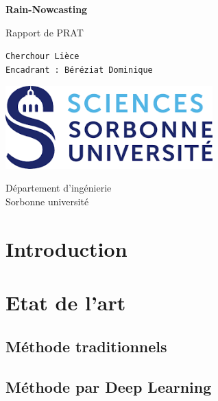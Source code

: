 \documentclass[a4paper]{article}
\begin{document}
\begin{titlepage}
    \begin{center}
            
        \Huge
        \textbf{Rain-Nowcasting}
        
            
        \vspace{0.5cm}
        \LARGE
        Rapport de PRAT
            
        \vspace{1.5cm}
            
        \texttt{Cherchour Lièce} \\ 
        \texttt{Encadrant : Béréziat Dominique}
            
        \vfill
        \vspace{0.8cm}
            
        \includegraphics[width=0.6\textwidth]{assets/sc_uni.png}
            
        \Large
        Département d'ingénierie\\
        Sorbonne université
    \end{center}
\end{titlepage}
\tableofcontents
\newpage
\section{Introduction}
\section{Etat de l'art}
\subsection{Méthode traditionnels}
\subsection{Méthode par Deep Learning}


\end{document}
